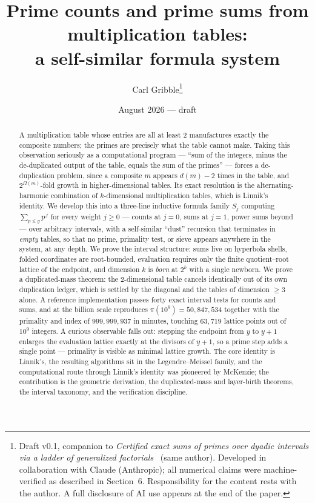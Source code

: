 \documentclass[11pt]{article}
\title{Prime counts and prime sums from multiplication tables:\\ a self-similar formula system}
\author{Carl Gribble\thanks{Draft v0.1, companion to \emph{Certified exact sums of primes over dyadic
intervals via a ladder of generalized factorials}~\cite{Companion} (same author). Developed in collaboration with Claude
(Anthropic); all numerical claims were machine-verified as described in Section~6. Responsibility for
the content rests with the author. A full disclosure of AI use appears at the end of the paper.}}
\date{August 2026 --- draft}
\theoremstyle{remark}
\begin{document}
\maketitle

\begin{abstract}
A multiplication table whose entries are all at least $2$ manufactures exactly the composite numbers;
the primes are precisely what the table cannot make. Taking this observation seriously as a computational
program --- ``sum of the integers, minus the de-duplicated output of the table, equals the sum of the
primes'' --- forces a de-duplication problem, since a composite $m$ appears $d(m)-2$ times in the table,
and $2^{\Omega(m)}$-fold growth in higher-dimensional tables. Its exact resolution is the
alternating-harmonic combination of $k$-dimensional multiplication tables, which is Linnik's identity.
We develop this into a three-line inductive formula family $S_j$ computing $\sum_{p \le y} p^{\,j}$ for
every weight $j \ge 0$ --- counts at $j=0$, sums at $j=1$, power sums beyond --- over arbitrary
intervals, with a self-similar ``dust'' recursion that terminates in \emph{empty} tables, so that no
prime, primality test, or sieve appears anywhere in the system, at any depth. We prove the interval
structure: sums live on hyperbola shells, folded coordinates are root-bounded, evaluation requires only
the finite quotient--root lattice of the endpoint, and dimension $k$ is \emph{born} at $2^k$ with a
single newborn. We prove a duplicated-mass theorem: the $2$-dimensional table cancels identically out
of its own duplication ledger, which is settled by the diagonal and the tables of dimension $\ge 3$
alone. A reference implementation passes forty exact interval tests for counts and sums, and at the
billion scale reproduces $\pi(10^9) = 50{,}847{,}534$ together with the primality and index of
$999{,}999{,}937$ in minutes, touching $63{,}719$ lattice points out of $10^9$ integers. A curious
observable falls out: stepping the endpoint from $y$ to $y+1$ enlarges the evaluation lattice exactly at
the divisors of $y+1$, so a prime step adds a single point --- primality is visible as minimal lattice
growth. The core identity is Linnik's, the resulting algorithms sit in the Legendre--Meissel family, and the
computational route through Linnik's identity was pioneered by McKenzie; the contribution is the
geometric derivation, the duplicated-mass and layer-birth theorems, the interval taxonomy, and the
verification discipline.
\end{abstract}
\end{document}
